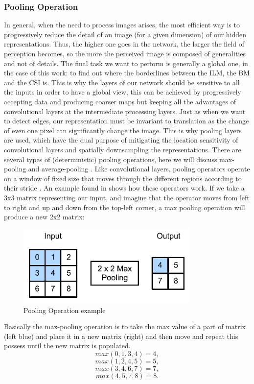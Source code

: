 \documentclass[12pt,a4paper]{scrartcl}
\begin{document}
\subsubsection{Pooling Operation}
In general, when the need to process images arises, the most efficient way is to progressively reduce the detail of an image (for a given dimension) of our hidden representations. Thus, the higher one goes in the network, the larger the field of perception becomes, so the more the perceived image is composed of generalities and not of details. The final task we want to perform is generally a global one, in the case of this work: to find out where the borderlines between the ILM, the BM and the CSI is. This is why the layers of our network should be sensitive to all the inputs in order to have a global view, this can be achieved by progressively accepting data and producing coarser maps but keeping all the advantages of convolutional layers at the intermediate processing layers. Just as when we want to detect edges, our representation must be invariant to translation as the change of even one pixel can significantly change the image. This is why pooling layers are used, which have the dual purpose of mitigating the location sensitivity of convolutional layers and spatially downsampling the representations. There are several types of (deterministic) pooling operations, here we will discuss max-pooling and average-pooling \cite{DFTPooling}. Like convolutional layers, pooling operators operate on a window of fixed size that moves through the different regions according to their stride \cite{DIDLBook}.
An example found in \cite{DIDLBook} shows how these operators work. If we take a 3x3 matrix representing our input, and imagine that the operator moves from left to right and up and down from the top-left corner, a max pooling operation will produce a new 2x2 matrix: 

\begin{figure}[H]
    \centering
    \includegraphics[width=0.8\textwidth]{./images/pooling_example.png}
    \caption{Pooling Operation example  \cite{DIDLBook}}
\end{figure}
Basically the max-pooling operation is to take the max value of a part of matrix (left blue) and place it in a new matrix (right) and then move and repeat this possess until the new matrix is populated.
\[max(0, 1, 3, 4) = 4,\]
\[max(1, 2, 4, 5) = 5,\]
\[max(3, 4, 6, 7) = 7,\]
\[max(4, 5, 7, 8) = 8.\]
\end{document}
